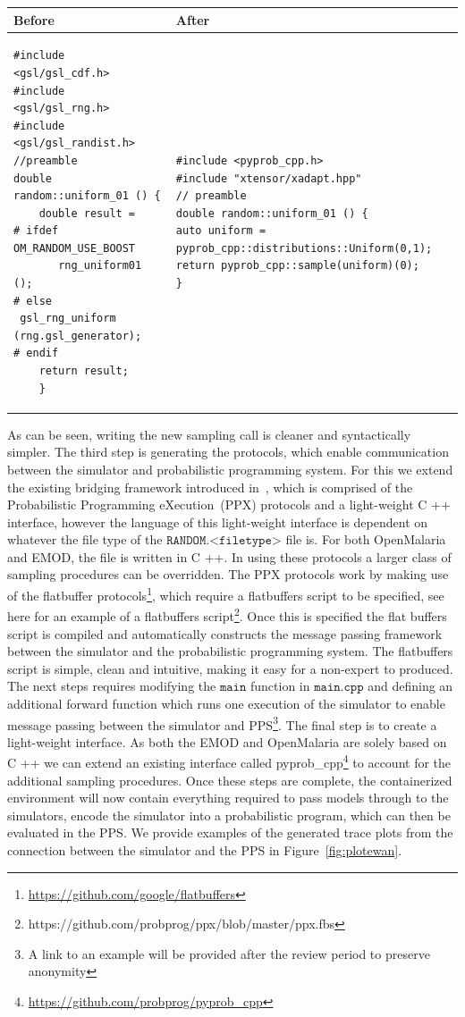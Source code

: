 \documentclass{article}
\begin{document}
\begin{table}[h!]
\footnotesize
\begin{tabular}{p{3.6cm}|p{3.6cm}}
Before  &  After  \\
\midrule
\begin{lstlisting}
#include <gsl/gsl_cdf.h>
#include <gsl/gsl_rng.h>
#include <gsl/gsl_randist.h>
//preamble
double random::uniform_01 () {
    double result =
# ifdef 
OM_RANDOM_USE_BOOST
       rng_uniform01 ();
# else
 gsl_rng_uniform (rng.gsl_generator);
# endif
    return result;
    }
\end{lstlisting}&
\begin{lstlisting}
#include <pyprob_cpp.h>
#include "xtensor/xadapt.hpp"
// preamble
double random::uniform_01 () {
auto uniform = pyprob_cpp::distributions::Uniform(0,1);
return pyprob_cpp::sample(uniform)(0);
}
\end{lstlisting}
\end{tabular} 
\end{table}
As can be seen, writing the new sampling call is cleaner and syntactically simpler. 
The third step is generating the protocols, which enable communication between the simulator and probabilistic programming system. 
For this we extend the existing bridging framework introduced in~\cite{baydin2018efficient}, which is comprised of the Probabilistic Programming eXecution~(PPX) protocols and a light-weight C ++ interface, however the language of this light-weight interface is dependent on whatever the file type of the $\texttt{RANDOM.<filetype>}$ file is. 
For both OpenMalaria and EMOD, the file is written in C ++.
In using these protocols a larger class of sampling procedures can be overridden. The PPX protocols work by making use of the flatbuffer protocols\footnote{\url{https://github.com/google/flatbuffers}}, which require a flatbuffers script to be specified, see here for an example of a flatbuffers script\footnote{https://github.com/probprog/ppx/blob/master/ppx.fbs}. Once this is specified the flat buffers script is compiled and automatically constructs the message passing framework between the simulator and the probabilistic programming system. The flatbuffers script is simple, clean and intuitive, making it easy for a non-expert to produced.
The next steps requires modifying the $\texttt{main}$ function in $\texttt{main.cpp}$ and defining an additional forward function which runs one execution of the simulator to enable message passing between the simulator and PPS\footnote{A link to an example will be provided after the review period to preserve anonymity}.
The final step is to create a light-weight interface. As both the EMOD and OpenMalaria are solely based on C ++ we can extend an existing interface called pyprob\_cpp\footnote{\url{https://github.com/probprog/pyprob_cpp}} to account for the additional sampling procedures.
Once these steps are complete, the containerized environment will now contain everything required to pass models through to the simulators, encode the simulator into a probabilistic program, which can then be evaluated in the PPS. We provide examples of the generated trace plots from the connection between the simulator and the PPS in Figure~\ref{fig:plotewan}. 
\end{document}
